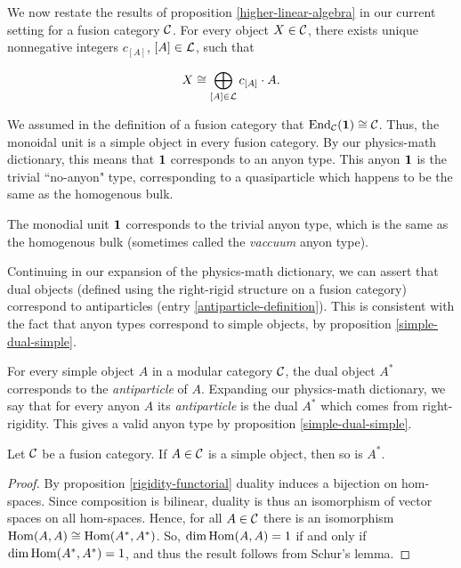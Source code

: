 We now restate the results of proposition \ref{higher-linear-algebra} in our current setting for a fusion category ${\mathcal C}$.  For every object $X\in {\mathcal C}$, there exists unique nonnegative integers $c_{[A]}$, $[A]\in {\mathcal L}$, such that

$$X\cong \bigoplus_{[A]\in {\mathcal L}}c_{[A]}\cdot A.$$

We assumed in the definition of a fusion category that $\operatorname{End}_{\mathcal C}({\mathbf 1})\cong {\mathcal C}$. Thus, the monoidal unit is a simple object in every fusion category. By our physics-math dictionary, this means that ${\mathbf 1}$ corresponds to an anyon type. This anyon ${\mathbf 1}$ is the trivial ``no-anyon" type, corresponding to a quasiparticle which happens to be the same as the homogenous bulk.

\begin{dict}\label{vacuum-anyon-definition} The monodial unit ${\mathbf 1} $ corresponds to the trivial anyon type, which is the same as the homogenous bulk (sometimes called the  {\em vaccuum} anyon type).
\end{dict}

\begin{rem} Continuing in our expansion of the physics-math dictionary, we can assert that dual objects (defined using the right-rigid structure on a fusion category) correspond to antiparticles (entry \ref{antiparticle-definition}). This is consistent with the fact that anyon types correspond to simple objects, by proposition \ref{simple-dual-simple}.
\end{rem}

\begin{dict}\label{antiparticle-definition}
For every simple object $A$ in a modular category ${\mathcal C}$, the dual object $A^*$ corresponds to the {\em antiparticle} of $A$.
Expanding our physics-math dictionary, we say that for every anyon $A$ its {\em antiparticle} is the dual $A^*$ which comes from right-rigidity. This gives a valid anyon type by proposition \ref{simple-dual-simple}.
\end{dict}

\begin{prop}\label{simple-dual-simple} Let ${\mathcal C}$ be a fusion category. If $A\in {\mathcal C}$ is a simple object, then so is $A^*$.
\end{prop}
\begin{proof} By proposition \ref{rigidity-functorial} duality induces a bijection on hom-spaces. Since composition is bilinear, duality is thus an isomorphism of vector spaces on all hom-spaces. Hence, for all $A\in {\mathcal C}$ there is an isomorphism $\operatorname{Hom}(A,A)\cong \operatorname{Hom}(A^*,A^*)$.  So, $\dim \operatorname{Hom}(A,A)= 1$ if and only if $\dim \operatorname{Hom}(A^*,A^*)=1$, and thus the result follows from Schur's lemma.
\end{proof}

